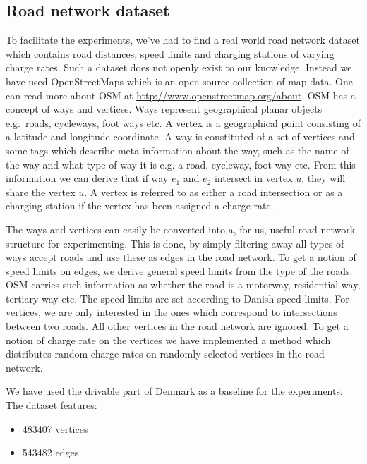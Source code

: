 \subsection{Road network dataset} 
\label{sub:setup}
To facilitate the experiments, we've had to find a real world road network dataset which contains road distances, speed limits and charging stations of varying charge rates. Such a dataset does not openly exist to our knowledge. Instead we have used OpenStreetMaps which is an open-source collection of map data. One can read more about OSM at \url{http://www.openstreetmap.org/about}. OSM has a concept of ways and vertices. Ways represent geographical planar objects e.g.\ roads, cycleways, foot ways etc. A vertex is a geographical point consisting of a latitude and longitude coordinate. A way is constituted of a set of vertices and some tags which describe meta-information about the way, such as the name of the way and what type of way it is e.g. a road, cycleway, foot way  etc. From this information we can derive that if way $e_1$ and $e_2$ intersect in vertex $u$, they will share the vertex $u$. A vertex is referred to as either a road intersection or as a charging station if the vertex has been assigned a charge rate.

The ways and vertices can easily be converted into a, for us, useful road network structure for experimenting. This is done, by simply filtering away all types of ways accept roads and use these as edges in the road network. To get a notion of speed limits on edges, we derive general speed limits from the type of the roads. OSM carries such information as whether the road is a motorway, residential way, tertiary way etc. The speed limits are set according to Danish speed limits. For vertices, we are only interested in the ones which correspond to intersections between two roads. All other vertices in the road network are ignored. To get a notion of charge rate on the vertices we have implemented a method which distributes random charge rates on randomly selected vertices in the road network.

We have used the drivable part of Denmark as a baseline for the experiments. The dataset features:
\begin{itemize}
    \item 483407 vertices
    \item 543482 edges
\end{itemize}